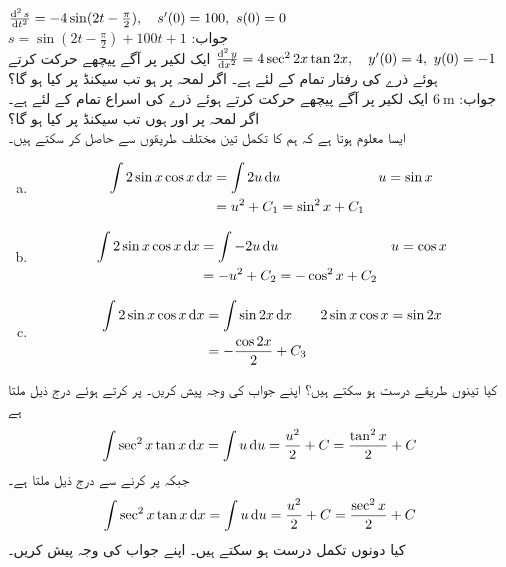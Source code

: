 $\tfrac{\dif^{\,2}s}{\dif t^2}=-4\sin(2t-\tfrac{\pi}{2}),\quad s'(0)=100,\,\, s(0)=0$\\
جواب:\quad
$s=\sin(2t-\tfrac{\pi}{2})+100t+1$
$\tfrac{\dif^{\,2} y}{\dif x^2}=4\sec^22x\tan 2x,\quad y'(0)=4,\,\,y(0)=-1$
ایک لکیر پر آگے پیچھے حرکت کرتے ہوئے ذرے کی رفتار تمام  کے لئے  ہے۔ اگر لمحہ  پر  ہو تب  سیکنڈ  پر  کیا ہو گا؟\\
جواب:\quad
$\SI{6}{\meter}$
ایک لکیر پر آگے پیچھے حرکت کرتے ہوئے ذرے کی اسراع تمام  کے لئے  ہے۔ اگر لمحہ  پر  اور  ہوں تب  سیکنڈ  پر  کیا ہو گا؟
\\
ایسا معلوم ہوتا ہے کہ ہم  کا تکمل تین مختلف طریقوں سے حاصل کر سکتے ہیں۔
\begin{enumerate}[a.]
\item
\begin{align*}
\int 2\sin x\cos x\dif x&=\int 2u\dif u&&u=\sin x\\
&=u^2+C_1=\sin^2x+C_1
\end{align*}
\item
\begin{align*}
\int 2\sin x\cos x\dif x&=\int -2u\dif u&&u=\cos x\\
&=-u^2+C_2=-\cos^2x+C_2
\end{align*}
\item
\begin{align*}
\int 2\sin x\cos x\dif x&=\int \sin 2x\dif x&&2\sin x\cos x=\sin 2x\\
&=-\frac{\cos 2x}{2}+C_3
\end{align*}
\end{enumerate}
کیا تینوں طریقے درست ہو سکتے ہیں؟ اپنے جواب کی وجہ پیش کریں۔ 
 پر کرتے ہوئے درج ذیل ملتا ہے
\begin{align*}
\int \sec^2x\tan x\dif x=\int u\dif u=\frac{u^2}{2}+C=\frac{\tan^2 x}{2}+C
\end{align*}
جبکہ  پر کرنے سے درج ذیل ملتا ہے۔
\begin{align*}
\int \sec^2x\tan x\dif x=\int u\dif u=\frac{u^2}{2}+C=\frac{\sec^2x}{2}+C
\end{align*}
کیا دونوں تکمل درست ہو سکتے ہیں۔ اپنے جواب کی وجہ پیش کریں۔

